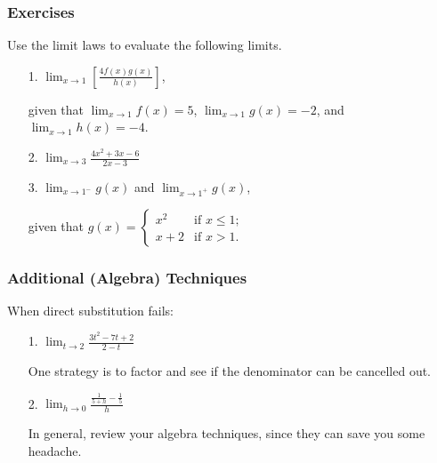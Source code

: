 \documentclass[14pt]{beamer}
\begin{document}
\begin{frame}
\frametitle{Exercises}
\footnotesize
Use the limit laws to evaluate the following limits.
\begin{itemize}
\item[1.\quad] $\displaystyle\lim_{x \to 1} \left[ \frac{4f(x)g(x)}{h(x)} \right]$,

\vspace{0.25pc}
given that $\displaystyle\lim_{x \to 1} f(x)=5$, $\displaystyle\lim_{x \to 1} g(x)=-2$, and $\displaystyle\lim_{x \to 1} h(x)=-4$.

\vspace{0.25pc}
\item[2.\quad] $\displaystyle\lim_{x \to 3} \frac{4x^2+3x-6}{2x-3}$

\vspace{0.75pc}
\item[3.\quad] $\displaystyle\lim_{x \to 1^-}g(x)$ \;and\; $\displaystyle\lim_{x \to 1^+}g(x)$, 

\vspace{0.25pc}
given that 
$g(x) = 
\begin{cases}
x^2 & \text{if $x \le 1$}; \\
x+2 & \text{if $x>1$}.
\end{cases}$ 
\end{itemize}
\end{frame}

\begin{frame}
\frametitle{Additional (Algebra) Techniques}
\small
When direct substitution fails:

\vspace{0.5pc}
\begin{itemize}
\item[1.\quad] $\displaystyle\lim_{t \to 2} \frac{3t^2-7t+2}{2-t}$

\vspace{0.25pc}
{\footnotesize One strategy is to factor and see if the denominator can be cancelled out.}

\vspace{0.5pc}
\item[2.\quad] $\displaystyle\lim_{h \to 0} \frac{\displaystyle \frac{1}{5+h}-\frac{1}{5} }{h}$

\vspace{0.25pc}
{\footnotesize In general, review your algebra techniques, since they can save you some headache.}
\end{itemize}
\end{frame}
\end{document}
